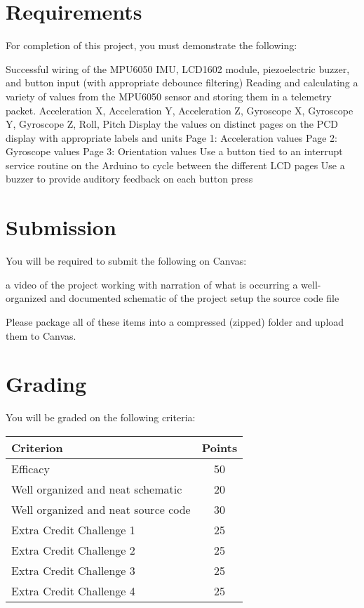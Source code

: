 \section*{Requirements} 
For completion of this project, you must demonstrate the following:
\begin{outline}
    \1 Successful wiring of the MPU6050 IMU, LCD1602 module, piezoelectric buzzer, and button input (with appropriate debounce filtering)
    \1 Reading and calculating a variety of values from the MPU6050 sensor and storing them in a telemetry packet.
        \2 Acceleration X,
        \2 Acceleration Y,
        \2 Acceleration Z,
        \2 Gyroscope X,
        \2 Gyroscope Y,
        \2 Gyroscope Z,
        \2 Roll,
        \2 Pitch
    \1 Display the values on distinct pages on the PCD display with appropriate labels and units
        \2 Page 1: Acceleration values
        \2 Page 2: Gyroscope values
        \2 Page 3: Orientation values
    \1 Use a button tied to an interrupt service routine on the Arduino to cycle between the different LCD pages
    \2 Use a buzzer to provide auditory feedback on each button press 
\end{outline}

\section*{Submission}
You will be required to submit the following on Canvas:
\begin{outline}
    \1 a video of the project working with narration of what is occurring
    \1 a well-organized and documented schematic of the project setup
    \1 the source code file
\end{outline}
Please package all of these items into a compressed (zipped) folder and upload them to Canvas.

\section*{Grading} 
You will be graded on the following criteria:
\begin{table}[h!]
    \begin{tabular}{l | c}
        \toprule
        Criterion & Points \\

        \midrule
        Efficacy & 50 \\
        Well organized and neat schematic & 20 \\
        Well organized and neat source code & 30 \\
        Extra Credit Challenge 1 \footnotemark & 25 \\
        Extra Credit Challenge 2 & 25 \\
        Extra Credit Challenge 3 & 25 \\
        Extra Credit Challenge 4 & 25 \\

        \bottomrule
    \end{tabular}
\end{table}

